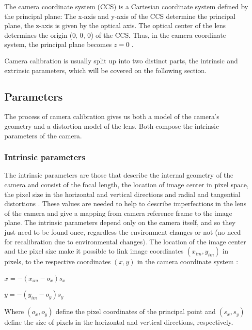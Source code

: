 \documentclass[msc, a4paper, classic, en]{ufbathesis}
\begin{document}
The camera coordinate system (CCS) is a Cartesian coordinate system defined by the principal plane: The x-axis and y-axis of the CCS determine the principal plane, the z-axis is given by the optical axis. The optical center of the lens determines the origin (0, 0, 0) of the CCS. Thus, in the camera coordinate system, the principal plane becomes ${ z = 0 }$ \cite{hanning2011high}.

Camera calibration is usually split up into two distinct parts, the intrinsic and extrinsic parameters, which will be covered on the following section.

\subsection{Parameters}

The process of camera calibration gives us both a model of the camera's geometry and a distortion model of the lens. Both compose the intrinsic parameters of the camera.

\subsubsection{Intrinsic parameters}

The intrinsic parameters are those that describe the internal geometry of the camera and consist of the focal length, the location of image center in pixel space, the pixel size in the horizontal and vertical directions and radial and tangential distortions \cite{malik2002}. These values are needed to help to describe imperfections in the lens of the camera and give a mapping from camera reference frame to the image plane. The intrinsic parameters depend only on the camera itself, and so they just need to be found once, regardless the environment changes or not (no need for recalibration due to environmental changes). The location of the image center and the pixel size make it possible to link image coordinates $(x_{im}, y_{im})$ in pixels, to the respective coordinates $(x, y)$ in the camera coordinate system \cite{malik2002}:

\begin{center}
$x = -(x_{im} - o_x)s_x$
\end{center}

\begin{center}
$y = -(y_{im} - o_y)s_y$
\end{center}

Where $(o_x, o_y)$ define the pixel coordinates of the principal point and $(s_x, s_y)$ define the size of pixels in the horizontal and vertical directions, respectively.
\end{document}
